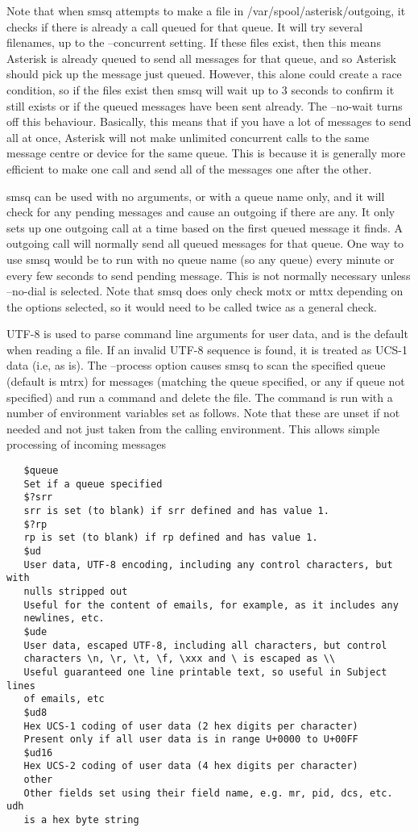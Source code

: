    Note that when smsq attempts to make a file in
   /var/spool/asterisk/outgoing, it checks if there is already a call
   queued for that queue. It will try several filenames, up to the
   --concurrent setting. If these files exist, then this means Asterisk
   is already queued to send all messages for that queue, and so Asterisk
   should pick up the message just queued. However, this alone could
   create a race condition, so if the files exist then smsq will wait up
   to 3 seconds to confirm it still exists or if the queued messages have
   been sent already. The --no-wait turns off this behaviour. Basically,
   this means that if you have a lot of messages to send all at once,
   Asterisk will not make unlimited concurrent calls to the same message
   centre or device for the same queue. This is because it is generally
   more efficient to make one call and send all of the messages one after
   the other.

   smsq can be used with no arguments, or with a queue name only, and it
   will check for any pending messages and cause an outgoing if there are
   any. It only sets up one outgoing call at a time based on the first
   queued message it finds. A outgoing call will normally send all queued
   messages for that queue. One way to use smsq would be to run with no
   queue name (so any queue) every minute or every few seconds to send
   pending message. This is not normally necessary unless --no-dial is
   selected. Note that smsq does only check motx or mttx depending on the
   options selected, so it would need to be called twice as a general
   check.

   UTF-8 is used to parse command line arguments for user data, and is
   the default when reading a file. If an invalid UTF-8 sequence is
   found, it is treated as UCS-1 data (i.e, as is).
   The --process option causes smsq to scan the specified queue (default
   is mtrx) for messages (matching the queue specified, or any if queue
   not specified) and run a command and delete the file. The command is
   run with a number of environment variables set as follows. Note that
   these are unset if not needed and not just taken from the calling
   environment. This allows simple processing of incoming messages
\begin{verbatim}
   $queue
   Set if a queue specified
   $?srr
   srr is set (to blank) if srr defined and has value 1.
   $?rp
   rp is set (to blank) if rp defined and has value 1.
   $ud
   User data, UTF-8 encoding, including any control characters, but with
   nulls stripped out
   Useful for the content of emails, for example, as it includes any
   newlines, etc.
   $ude
   User data, escaped UTF-8, including all characters, but control
   characters \n, \r, \t, \f, \xxx and \ is escaped as \\
   Useful guaranteed one line printable text, so useful in Subject lines
   of emails, etc
   $ud8
   Hex UCS-1 coding of user data (2 hex digits per character)
   Present only if all user data is in range U+0000 to U+00FF
   $ud16
   Hex UCS-2 coding of user data (4 hex digits per character)
   other
   Other fields set using their field name, e.g. mr, pid, dcs, etc. udh
   is a hex byte string
\end{verbatim}

